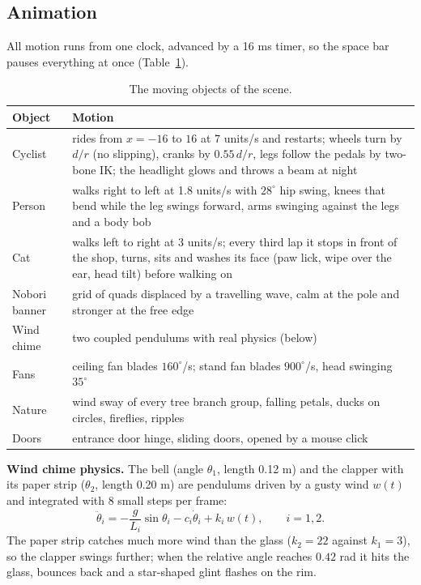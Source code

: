 \documentclass[10pt,a4paper]{article}
\begin{document}
\subsection{Animation}\label{sec:anim}
All motion runs from one clock, advanced by a 16 ms timer, so the space bar pauses everything at once (Table~\ref{tab:motion}).
\begin{table}[htbp]
\centering\small
\begin{tabular}{@{}p{2.6cm}p{13.3cm}@{}}
\toprule
\textbf{Object} & \textbf{Motion}\\
\midrule
Cyclist & rides from $x=-16$ to $16$ at 7 units/s and restarts; wheels turn by $d/r$ (no slipping), cranks by $0.55\,d/r$, legs follow the pedals by two-bone IK; the headlight glows and throws a beam at night\\
Person & walks right to left at 1.8 units/s with $28^\circ$ hip swing, knees that bend while the leg swings forward, arms swinging against the legs and a body bob\\
Cat & walks left to right at 3 units/s; every third lap it stops in front of the shop, turns, sits and washes its face (paw lick, wipe over the ear, head tilt) before walking on\\
Nobori banner & grid of quads displaced by a travelling wave, calm at the pole and stronger at the free edge\\
Wind chime & two coupled pendulums with real physics (below)\\
Fans & ceiling fan blades $160^\circ$/s; stand fan blades $900^\circ$/s, head swinging $35^\circ$\\
Nature & wind sway of every tree branch group, falling petals, ducks on circles, fireflies, ripples\\
Doors & entrance door hinge, sliding doors, opened by a mouse click\\
\bottomrule
\end{tabular}
\caption{The moving objects of the scene.}\label{tab:motion}
\end{table}
\textbf{Wind chime physics.} The bell (angle $\theta_1$, length 0.12 m) and the clapper with its paper strip ($\theta_2$, length 0.20 m) are pendulums driven by a gusty wind $w(t)$ and integrated with 8 small steps per frame:
\begin{equation}
\ddot\theta_i=-\frac{g}{L_i}\sin\theta_i-c_i\dot\theta_i+k_i\,w(t),\qquad i=1,2.
\end{equation}
The paper strip catches much more wind than the glass ($k_2=22$ against $k_1=3$), so the clapper swings further; when the relative angle reaches $0.42$ rad it hits the glass, bounces back and a star-shaped glint flashes on the rim.
\end{document}
